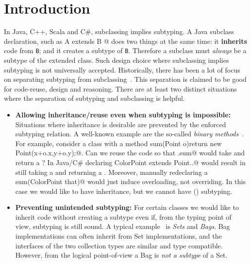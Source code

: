 \saveSpace
\section{Introduction}\label{sec:intro}
\saveSpace
In Java, C++, Scala and C\#, subclassing 
implies subtyping. A Java subclass declaration, such as 
\Q@class A extends B {}@
\noindent does two things at the same time:
it {\bf inherits} code from \lstinline{B}; and it creates
a subtype of \lstinline{B}. Therefore a subclass must \emph{always} be
a subtype of the extended class.
Such design choice where subclassing implies subtyping is not
universally accepted.
Historically, there has been a lot of focus on
separating subtyping from subclassing~\cite{cook}.  This separation is claimed to be
good for code-reuse, design and reasoning. There are at
least two distinct situations where the separation of subtyping and 
subclassing is helpful.

\begin{itemize}

\item {\bf Allowing inheritance/reuse even when subtyping is impossible:} 
Situations where inheritance is desirable are prevented
by the enforced subtyping relation. A well-known example are the so-called \emph{binary methods}~\cite{cook,bruce96binary}.
For example, consider a class \Q@Point@ with a method 
\Q@Point sum(Point o){return new Point(x+o.x,y+o.y);}@.
Can we reuse the \Q@Point@ code so that \Q@ColorPoint.sum@
would take and return a \Q@ColorPoint@?
In Java/C\# declaring \Q@class ColorPoint extends Point{..}@ would result
in \Q@sum@ still taking a \Q@Point@ and returning a \Q@Point@.
Moreover, manually redeclaring a \Q@ColorPoint sum(ColorPoint that)@
would just induce overloading, not overriding.
In this case we would like to have inheritance, but we cannot
have () subtyping.
%

\item {\bf Preventing unintended subtyping:} For certain classes we
  would like to inherit code without creating a subtype even if, from
  the typing point of view, subtyping is still sound. A typical
  example~\cite{LaLonde:1991:SSS:110673.110679} is \emph{Sets} and
  \emph{Bags}. Bag implementations can often inherit 
  from Set implementations, and the interfaces of the two collection types are
  similar and type compatible. 
  However, from the logical point-of-view a Bag is \emph{not a
    subtype} of a Set. 

\end{itemize}

